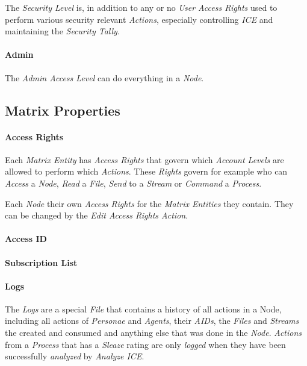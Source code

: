 The \emph{Security Level} is, in addition to any or no \emph{User Access Rights}
used to perform various security relevant \emph{Actions}, especially controlling
\emph{ICE} and maintaining the \emph{Security Tally}.

\paragraph{Admin}

The \emph{Admin Access Level} can do everything in a \emph{Node}.

\subsection{Matrix Properties}
\paragraph{Access Rights}
Each \emph{Matrix Entity} has \emph{Access Rights} that govern which
\emph{Account Levels} are allowed to perform which \emph{Actions}. These
\emph{Rights} govern for example who can \emph{Access} a \emph{Node}, \emph{Read}
a \emph{File}, \emph{Send} to a \emph{Stream} or \emph{Command} a \emph{Process}.

Each \emph{Node} their own \emph{Access Rights} for the \emph{Matrix Entities} they
contain. They can be changed by the \emph{Edit Access Rights Action}.

\paragraph{Access ID}

\paragraph{Subscription List}

\paragraph{Logs}

The \emph{Logs} are a special \emph{File} that contains a history of all
actions in a Node, including all actions of \emph{Personae} and \emph{Agents},
their \emph{AIDs}, the \emph{Files} and \emph{Streams} the created and consumed
and anything else that was done in the \emph{Node}. \emph{Actions} from a
\emph{Process} that has a \emph{Sleaze} rating are only \emph{logged} when
they have been successfully \emph{analyzed} by \emph{Analyze ICE}.

